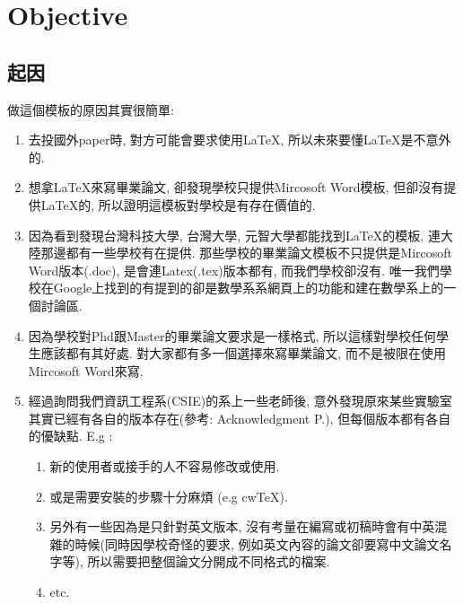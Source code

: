 \chapter{Objective}
\label{chapter:objective}

\baselineskip=26pt

\section{起因}

做這個模板的原因其實很簡單:

\begin{enumerate}
  \item 去投國外paper時, 對方可能會要求使用LaTeX, 所以未來要懂LaTeX是不意外的.

  \item 想拿LaTeX來寫畢業論文, 卻發現學校只提供Mircosoft Word模板, 但卻沒有提供LaTeX的, 所以證明這模板對學校是有存在價值的.

  \item 因為看到發現台灣科技大學\cite{web:latex:template:ntust}, 台灣大學\cite{web:latex:template:ntu}, 元智大學\cite{web:latex:template:ntust}都能找到LaTeX的模板, 連大陸那邊都有一些學校有在提供. 那些學校的畢業論文模板不只提供是Mircosoft Word版本(.doc), 是會連Latex(.tex)版本都有, 而我們學校卻沒有. 唯一我們學校在Google上找到的有提到的卻是數學系系網頁上的功能\cite{web:latex:ncku_math_introduction}和建在數學系上的一個討論區\cite{web:latex:ncku_math_forum}.

  \item 因為學校對Phd跟Master的畢業論文要求是一樣格式, 所以這樣對學校任何學生應該都有其好處. 對大家都有多一個選擇來寫畢業論文, 而不是被限在使用Mircosoft Word來寫.

  \item 經過詢問我們資訊工程系(CSIE)的系上一些老師後, 意外發現原來某些實驗室其實已經有各自的版本存在(參考: Acknowledgment P.\pageref{acknowledgments-chi}), 但每個版本都有各自的優缺點. E.g :

    \begin{enumerate}

      \item 新的使用者或接手的人不容易修改或使用.

      \item 或是需要安裝的步驟十分麻煩 (e.g cwTeX\cite{web:latex:cwtex}).

      \item 另外有一些因為是只針對英文版本, 沒有考量在編寫或初稿時會有中英混雜的時候(同時因學校奇怪的要求, 例如英文內容的論文卻要寫中文論文名字等), 所以需要把整個論文分開成不同格式的檔案.

      \item etc.

    \end{enumerate}

\end{enumerate}

